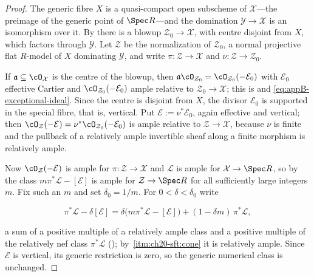 \begin{proof}
The generic fibre \(X\) is a quasi-compact open subscheme of
\(\mathcal X\)---the preimage of the generic point of \(\Spec R\)---and the
domination \(\mathcal Y\to\mathcal X\) is an isomorphism over it.  By
 there is a blowup
\(\mathcal Z_0\to\mathcal X\), with centre disjoint from \(X\), which
factors through \(\mathcal Y\).  Let \(\mathcal Z\) be the normalization of
\(\mathcal Z_0\), a normal projective flat \(R\)-model of \(X\) dominating
\(\mathcal Y\), and write \(\pi:\mathcal Z\to\mathcal X\) and
\(\nu:\mathcal Z\to\mathcal Z_0\).

If \(\mathfrak a\subseteq\cO_{\mathcal X}\) is the centre of the blowup,
then \(\mathfrak a\cO_{\mathcal Z_0}=\cO_{\mathcal Z_0}(-\mathcal E_0)\)
with \(\mathcal E_0\) effective Cartier and
\(\cO_{\mathcal Z_0}(-\mathcal E_0)\) ample relative to
\(\mathcal Z_0\to\mathcal X\); this is
 and
\eqref{eq:appB-exceptional-ideal}.  Since the centre is disjoint from
\(X\), the divisor \(\mathcal E_0\) is supported in the special fibre, that
is, vertical.  Put \(\mathcal E:=\nu^*\mathcal E_0\), again effective and
vertical; then
\(\cO_{\mathcal Z}(-\mathcal E)=\nu^*\cO_{\mathcal Z_0}(-\mathcal E_0)\) is
ample relative to \(\mathcal Z\to\mathcal X\), because \(\nu\) is finite and
the pullback of a relatively ample invertible sheaf along a finite morphism
is relatively ample.

Now \(\cO_{\mathcal Z}(-\mathcal E)\) is ample for
\(\pi:\mathcal Z\to\mathcal X\) and \(\mathcal L\) is ample for
\(\mathcal X\to\Spec R\), so by \cite[4.6.13]{EGAII} the class
\(m\pi^*\mathcal L-[\mathcal E]\) is ample for
\(\mathcal Z\to\Spec R\) for all sufficiently large integers \(m\).  Fix
such an \(m\) and set \(\delta_0=1/m\).  For \(0<\delta<\delta_0\) write

\[
 \pi^*\mathcal L-\delta[\mathcal E]
 =\delta\bigl(m\pi^*\mathcal L-[\mathcal E]\bigr)
  +(1-\delta m)\,\pi^*\mathcal L ,
\]

a sum of a positive multiple of a relatively ample class and a positive
multiple of the relatively nef class \(\pi^*\mathcal L\)
(); by
\,\cref{itm:ch20-sft:cone} it is relatively
ample.  Since \(\mathcal E\) is vertical, its generic restriction is zero,
so the generic numerical class is unchanged.
\end{proof}

